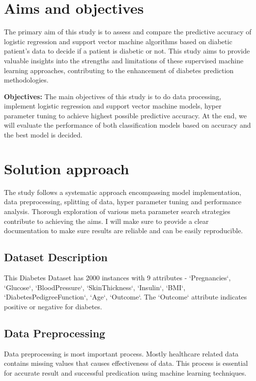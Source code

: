 \section{Aims and objectives}
\label{sec:intro_aims_obj}

The primary aim of this study is to assess and compare the predictive accuracy of logistic regression and support vector machine algorithms based on diabetic patient's data to decide if a patient is diabetic or not. This study aims to provide valuable insights into the strengths and limitations of these supervised machine learning approaches, contributing to the enhancement of diabetes prediction methodologies.

\textbf{Objectives:} 
The main objectives of this study is to do data processing, implement logistic regression and support vector machine models, hyper parameter tuning to achieve highest possible predictive accuracy. At the end, we will evaluate the performance of both classification models based on accuracy and the best model is decided.

\section{Solution approach}
\label{sec:intro_sol} %
The study follows a systematic approach encompassing model implementation, data preprocessing, splitting of data, hyper parameter tuning and performance analysis. Thorough exploration of various meta parameter search strategies contribute to achieving the aims. I will make sure to provide a clear documentation to make sure results are reliable and can be easily reproducible.

\subsection{Dataset Description}
\label{sec:intro_some_sub1}
This Diabetes Dataset \cite{dataset} has 2000 instances with 9 attributes - `Pregnancies`, `Glucose`, `BloodPressure`, `SkinThickness`, `Insulin`, `BMI`, `DiabetesPedigreeFunction`, `Age`, `Outcome`. The `Outcome` attribute indicates positive or negative for diabetes. 

\subsection{Data Preprocessing}
\label{sec:intro_some_sub2}
Data preprocessing is most important process. Mostly healthcare related data contains missing values that causes effectiveness of data. This process is essential for accurate result and successful predication using machine learning techniques.

